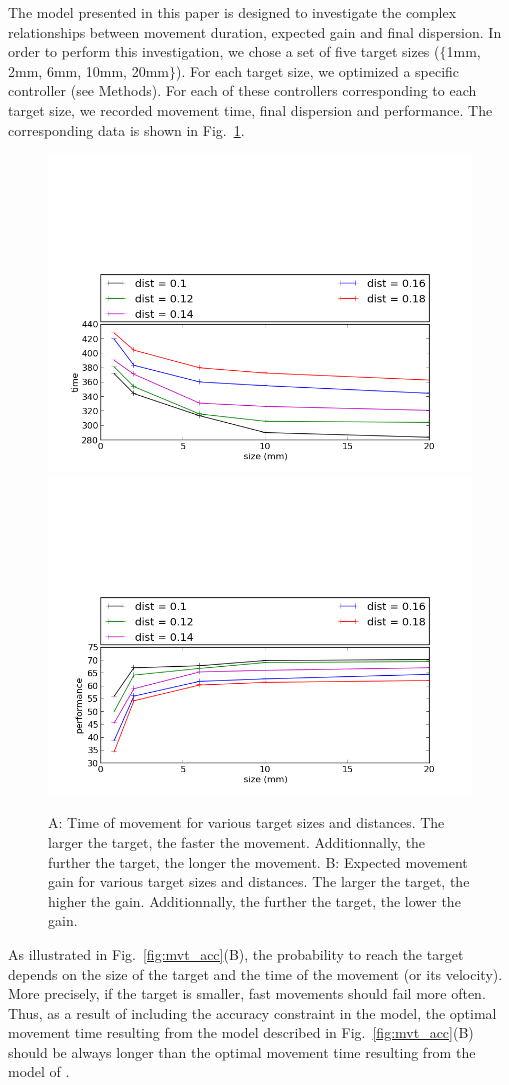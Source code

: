 \documentclass[10pt]{article}
\begin{document}
The model presented in this paper is designed to investigate the complex relationships between movement duration, expected gain and final dispersion. In order to perform this investigation, we chose a set of five target sizes ($\{$1mm, 2mm, 6mm, 10mm, 20mm$\}$).
For each target size, we optimized a specific controller (see Methods). For each of these controllers corresponding to each target size, we recorded movement time, final dispersion and performance. The corresponding data is shown in Fig.~\ref{fig:fitts_time}.

\begin{figure}[htp]
  \centering
\includegraphics[width=.5\columnwidth]{images/temps_fitts}
\includegraphics[width=.5\columnwidth]{images/cout_fitts}
  \caption{A: Time of movement for various target sizes and distances. The larger the target, the faster the movement. Additionnally, the further the target, the longer the movement.
B: Expected movement gain for various target sizes and distances. The larger the target, the higher the gain. Additionnally, the further the target, the lower the gain.
\label{fig:fitts_time}}
\end{figure}

As illustrated in Fig.~\ref{fig:mvt_acc}(B), the probability to reach the target depends on the size of the target and the time of the movement (or its velocity). More precisely, if the target is smaller, fast movements should fail more often. Thus, as a result of including the accuracy constraint in the model, the optimal movement time resulting from the model described in Fig.~\ref{fig:mvt_acc}(B) should be always longer than the optimal movement time resulting from the model of \cite{rigoux12}.
\end{document}
